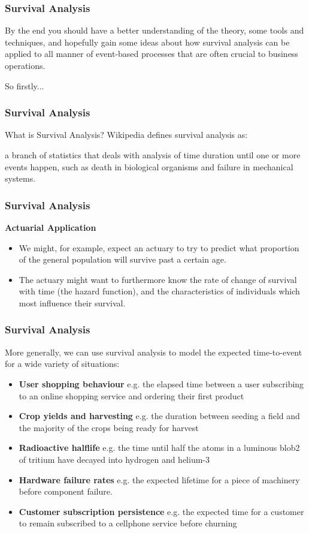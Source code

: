 \documentclass[]{beamer}
\begin{document}
	\begin{frame}
		\frametitle{Survival Analysis}
		By the end you should have a better understanding of the theory, some tools and techniques, and hopefully gain some ideas about how survival analysis can be applied to all manner of event-based processes that are often crucial to business operations.
		
		So firstly...
	\end{frame}
	\begin{frame}
		\frametitle{Survival Analysis}
		What is Survival Analysis?
		Wikipedia defines survival analysis as:
		
		a branch of statistics that deals with analysis of time duration until one or more events happen, such as death in biological organisms and failure in mechanical systems.
	\end{frame}
	\begin{frame}
		\frametitle{Survival Analysis}
		\large
		\noindent \textbf{Actuarial Application}
		\begin{itemize}
			\item We might, for example, expect an actuary to try to predict what proportion of the general population will survive past a certain age. 
			\item The actuary might want to furthermore know the rate of change of survival with time (the hazard function), and the characteristics of individuals which most influence their survival.
		\end{itemize}
		
		
	\end{frame}
	\begin{frame}
		\frametitle{Survival Analysis}
		More generally, we can use survival analysis to model the expected time-to-event for a wide variety of situations:
		\begin{itemize}
			\item \textbf{User shopping behaviour} e.g. the elapsed time between a user subscribing to an online shopping service and ordering their first product
			\item \textbf{Crop yields and harvesting} e.g. the duration between seeding a field and the majority of the crops being ready for harvest
			\item \textbf{Radioactive halflife} e.g. the time until half the atoms in a luminous blob2 of tritium have decayed into hydrogen and helium-3
			\item \textbf{Hardware failure rates} e.g. the expected lifetime for a piece of machinery before component failure.
			\item \textbf{Customer subscription persistence} e.g. the expected time for a customer to remain subscribed to a cellphone service before churning
			
		\end{itemize}
	\end{frame}
\end{document}

